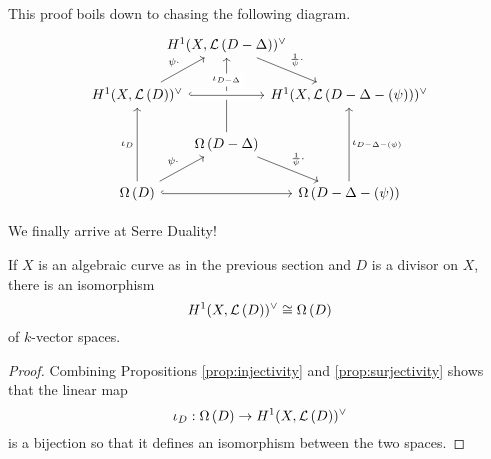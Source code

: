 \begin{cat}
  This proof boils down to chasing the following diagram.
  \[\begin{tikzcd}[column sep=-2em]
    & {\dual{D-\Delta}} \\
    {\dual{D}} && {\dual{D-\Delta-(\psi)}} \\
    & {\diffs{D-\Delta}} \\
    {\diffs{D}} && {\diffs{D-\Delta-(\psi)}}
    \arrow["\psi\cdot", from=2-1, to=1-2]
    \arrow["{\frac1{\psi}\cdot}", from=1-2, to=2-3]
    \arrow["\iota_D", from=4-1, to=2-1]
    \arrow["{\iota_{D-\Delta}}"{description, pos=0.7}, from=3-2, to=1-2]
    \arrow["\iota_{D-\Delta-(\psi)}"', from=4-3, to=2-3]
    \arrow[hook, crossing over, from=2-1, to=2-3]
    \arrow[hook, from=4-1, to=4-3]
    \arrow["\psi\cdot", from=4-1, to=3-2]
    \arrow["{\frac1{\psi}\cdot}", from=3-2, to=4-3]
  \end{tikzcd}\]
\end{cat}

We finally arrive at Serre Duality!
\begin{thm}\label{thm:serre}
  If $X$ is an algebraic curve as in the previous section
  and $D$ is a divisor on $X$, there is an isomorphism
  \[
    H^1(X,\mathcal{L}\left(D\right))^{\vee}\cong\Omega\left(D\right)
  \]
  of $k$-vector spaces.
\end{thm}
\begin{proof}
  Combining Propositions \ref{prop:injectivity} and \ref{prop:surjectivity}
  shows that the linear map
  \[\iota_{D}:\Omega\left(D\right)\to H^1(X,\mathcal{L}\left(D\right))^{\vee}\]
  is a bijection so that it defines an isomorphism between the two spaces.
\end{proof}

